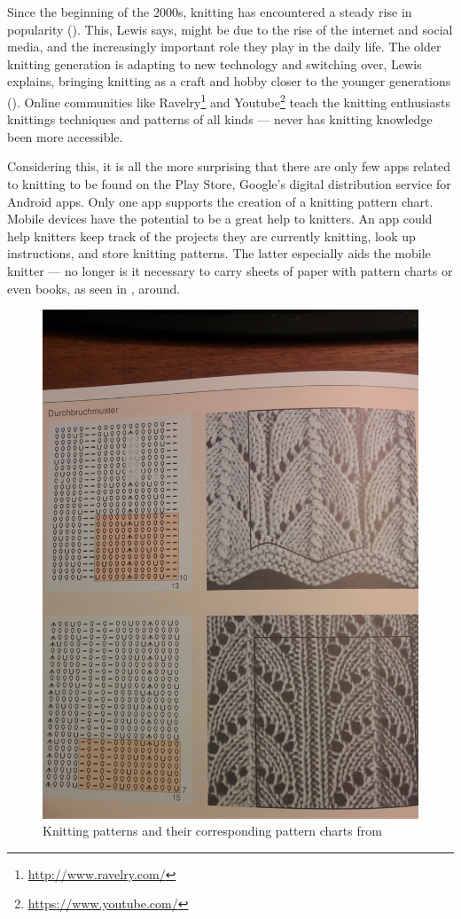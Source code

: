 Since the beginning of the 2000s, knitting has encountered a steady rise in popularity (\cite{lewis_rise_of_knitting}). This, Lewis says, might be due to the rise of the internet and social media, and the increasingly important role they play in the daily life. The older knitting generation is adapting to new technology and switching over, Lewis explains, bringing knitting as a craft and hobby closer to the younger generations (\cite{lewis_rise_of_knitting}). Online communities like Ravelry\footnote{\url{http://www.ravelry.com/}} and Youtube\footnote{\url{https://www.youtube.com/}} teach the knitting enthusiasts knittings techniques and patterns of all kinds --- never has knitting knowledge been more accessible.

Considering this, it is all the more surprising that there are only few apps related to knitting to be found on the Play Store, Google's digital distribution service for Android apps. Only one app supports the creation of a knitting pattern chart. Mobile devices have the potential to be a great help to knitters. An app could help knitters keep track of the projects they are currently knitting, look up instructions, and store knitting patterns. The latter especially aids the mobile knitter --- no longer is it necessary to carry sheets of paper with pattern charts or even books, as seen in , around.

\begin{figure}[H]
	\centering
    \includegraphics[width=.45\textwidth]{images/knitting_pattern_chart_book.jpg}
   \caption[{Knitting patterns and their corresponding pattern charts \protect{}}]{Knitting patterns and their corresponding pattern charts from \protect\cite[p142]{Natter1983}}
   \label{fig:knitting_book}
\end{figure}

